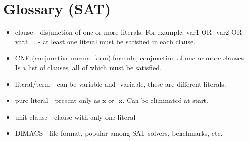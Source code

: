 ﻿\section{Glossary (SAT)}

\begin{itemize}

\item clause - disjunction of one or more literals. For example: var1 OR -var2 OR var3 ... - at least one literal must be satisfied in each clause.

\item CNF (conjunctive normal form) formula, conjunction of one or more clauses. Is a list of clauses, all of which must be satisfied.

\item literal/term - can be variable and -variable, these are different literals.

\item pure literal - present only as x or -x. Can be eliminated at start.

\item unit clause - clause with only one literal.

\item DIMACS - file format, popular among SAT solvers, benchmarks, etc.

\end{itemize}
